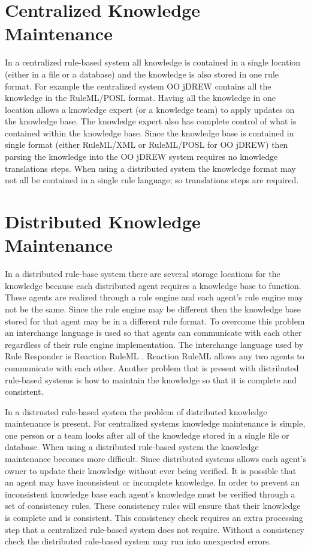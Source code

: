 \documentclass[12pt]{report}
\begin{document}
\section{Centralized Knowledge Maintenance}
In a centralized rule-based system all knowledge is contained in a single location (either in a file or a database) and the knowledge is also stored in one rule format.  For example the centralized system OO jDREW contains all the knowledge in the RuleML/POSL \cite{POSL} format.  Having all the knowledge in one location allows a knowledge expert (or a knowledge team) to apply updates on the knowledge base.  The knowledge expert also has complete control of what is contained within the knowledge base.  Since the knowledge base is contained in single format (either RuleML/XML or RuleML/POSL for OO jDREW) then parsing the knowledge into the OO jDREW system requires no knowledge translations steps.  When using a distributed system the knowledge format may not all be contained in a single rule language; so translations steps are required.

\section{Distributed Knowledge Maintenance}
In a distributed rule-base system there are several storage locations for the knowledge because each distributed agent requires a knowledge base to function.  These agents are realized through a rule engine and each agent's rule engine may not be the same.  Since the rule engine may be different then the knowledge base stored for that agent may be in a different rule format.  To overcome this problem an interchange language is used so that agents can communicate with each other regardless of their rule engine implementation.  The interchange language used by Rule Responder is Reaction RuleML \cite{ReactionRuleML}.  Reaction RuleML allows any two agents to communicate with each other.  Another problem that is present with distributed rule-based systems is how to maintain the knowledge so that it is complete and consistent.

In a distrusted rule-based system the problem of distributed knowledge maintenance is present.  For centralized systems knowledge maintenance is simple, one person or a team looks after all of the knowledge stored in a single file or database.  When using a distributed rule-based system the knowledge maintenance becomes more difficult.  Since distributed systems allows each agent's owner to update their knowledge without ever being verified.  It is possible that an agent may have inconsistent or incomplete knowledge.  In order to prevent an inconsistent knowledge base each agent's knowledge must be verified through a set of consistency rules.  These consistency rules \cite{ConsistencyRules} will ensure that their knowledge is complete and is consistent.  This consistency check requires an extra processing step that a centralized rule-based system does not require.  Without a consistency check the distributed rule-based system may run into unexpected errors.
\end{document}
